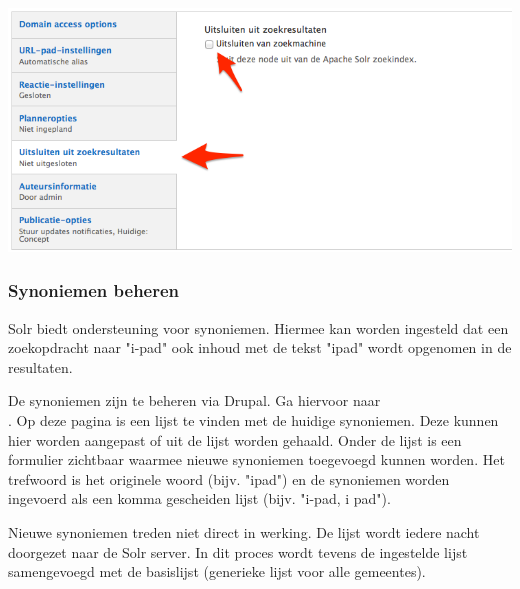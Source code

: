 \begin{center}
	\includegraphics[width=\textwidth]{img/solr-exclude.png}
\end{center}

\subsubsection{Synoniemen beheren}

Solr biedt ondersteuning voor synoniemen. Hiermee kan worden ingesteld dat een zoekopdracht naar "i-pad" ook inhoud met de tekst "ipad" wordt opgenomen in de resultaten.

De synoniemen zijn te beheren via Drupal. Ga hiervoor naar \\ . Op deze pagina is een lijst te vinden met de huidige synoniemen. Deze kunnen hier worden aangepast of uit de lijst worden gehaald. Onder de lijst is een formulier zichtbaar waarmee nieuwe synoniemen toegevoegd kunnen worden. Het trefwoord is het originele woord (bijv. "ipad") en de synoniemen worden ingevoerd als een komma gescheiden lijst (bijv. "i-pad, i pad").

Nieuwe synoniemen treden niet direct in werking. De lijst wordt iedere nacht doorgezet naar de Solr server. In dit proces wordt tevens de ingestelde lijst samengevoegd met de basislijst (generieke lijst voor alle gemeentes).
